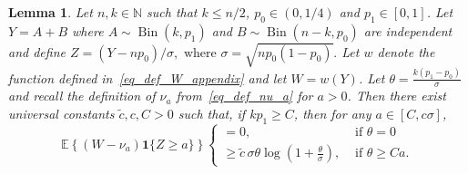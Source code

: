 \documentclass{article}
\newcommand{\one}{\mathbf{1}}
\newtheorem{lemma}{Lemma}
\begin{document}
\begin{lemma}\label{lem_truncchisq_mean}
Let $n,k \in \mathbb N$ such that $k \leq n/2$, $p_0 \in (0,1/4)$ and $p_1 \in [0,1]$. 
Let $Y = A+B$ where $A \sim \operatorname{Bin}(k,p_1)$ and $B \sim \operatorname{Bin}(n-k,p_0)$ are independent and define 
$Z = (Y-np_0)/\sigma, \text{ where } \sigma = \sqrt{np_0(1-p_0)}.$ 
Let $w$ denote the function defined in~\eqref{eq_def_W_appendix} and let $W = w(Y)$.
Let $\theta = \frac{k(p_1 - p_0)}{\sigma}$ and recall the definition of $\nu_a$ from~\eqref{eq_def_nu_a} for $a > 0$. 
Then there exist universal constants $\tilde c, c,C>0$ such that, if $kp_1 \geq C$, then for any $a \in [C,c\sigma]$,
$$
\mathbb{E}\left\{\left(W-\nu_{a}\right) \one{\{Z \geq a\}}\right\} \begin{cases}=0, & \text { if } \theta = 0   \\[5pt]
\geq \tilde c \, \sigma \theta \log\left(1+ \frac{\theta}{\sigma}\right), & \text { if } \theta \geq C a.
\end{cases}
$$

\end{lemma}
\end{document}
